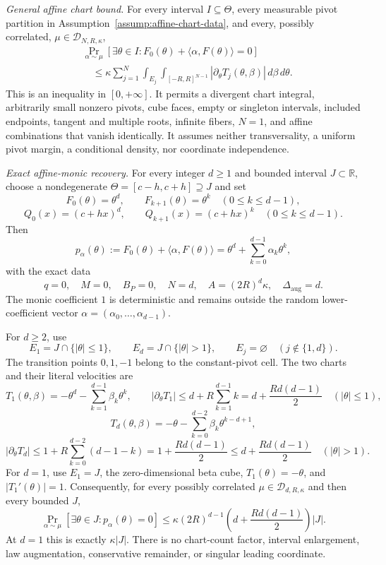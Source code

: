 \begin{theorem}
\emph{General affine chart bound.}
For every interval $I\subseteq\Theta$, every measurable pivot partition in
Assumption~\ref{assump:affine-chart-data}, and every, possibly correlated,
$\mu\in\mathcal D_{N,R,\kappa}$,
\[
\begin{aligned}
&\Pr_{\alpha\sim\mu}
 [\exists\theta\in I:F_0(\theta)+\langle\alpha,F(\theta)\rangle=0]\\
&\quad\leq
\kappa\sum_{j=1}^N\int_{E_j}\int_{[-R,R]^{N-1}}
 |\partial_\theta T_j(\theta,\beta)|\,d\beta\,d\theta.
\end{aligned}
\tag{R3}
\]
This is an inequality in $[0,+\infty]$.  It permits a divergent chart
integral, arbitrarily small nonzero pivots, cube faces, empty or singleton
intervals, included endpoints, tangent and multiple roots, infinite fibers,
$N=1$, and affine combinations that vanish identically.  It assumes neither
transversality, a uniform pivot margin, a conditional density, nor coordinate
independence.

\emph{Exact affine-monic recovery.}
For every integer $d\geq1$ and bounded interval $J\subset\mathbb R$, choose a
nondegenerate $\Theta=[c-h,c+h]\supseteq J$ and set
\[
F_0(\theta)=\theta^d,
\qquad
F_{k+1}(\theta)=\theta^k\quad(0\leq k\leq d-1),
\]
\[
Q_0(x)=(c+hx)^d,
\qquad
Q_{k+1}(x)=(c+hx)^k\quad(0\leq k\leq d-1).
\]
Then
\[
p_\alpha(\theta)
:=F_0(\theta)+\langle\alpha,F(\theta)\rangle
=\theta^d+\sum_{k=0}^{d-1}\alpha_k\theta^k,
\]
with the exact data
\[
q=0,
\quad M=0,
\quad B_P=0,
\quad N=d,
\quad A=(2R)^d\kappa,
\quad \Delta_{\mathrm{aug}}=d.
\]
The monic coefficient $1$ is deterministic and remains outside the random
lower-coefficient vector $\alpha=(\alpha_0,\ldots,\alpha_{d-1})$.

For $d\geq2$, use
\[
E_1=J\cap\{|\theta|\leq1\},
\qquad
E_d=J\cap\{|\theta|>1\},
\qquad
E_j=\varnothing\quad(j\notin\{1,d\}).
\]
The transition points $0,1,-1$ belong to the constant-pivot cell.  The two
charts and their literal velocities are
\[
T_1(\theta,\beta)
=-\theta^d-\sum_{k=1}^{d-1}\beta_k\theta^k,
\qquad
|\partial_\theta T_1|
\leq d+R\sum_{k=1}^{d-1}k
=d+\frac{Rd(d-1)}2
\quad(|\theta|\leq1),
\]
\[
T_d(\theta,\beta)
=-\theta-\sum_{k=0}^{d-2}\beta_k\theta^{k-d+1},
\]
\[
|\partial_\theta T_d|
\leq1+R\sum_{k=0}^{d-2}(d-1-k)
=1+\frac{Rd(d-1)}2
\leq d+\frac{Rd(d-1)}2
\quad(|\theta|>1).
\]
For $d=1$, use $E_1=J$, the zero-dimensional beta cube,
$T_1(\theta)=-\theta$, and $|T_1'(\theta)|=1$.  Consequently, for every
possibly correlated $\mu\in\mathcal D_{d,R,\kappa}$ and then every bounded
$J$,
\[
\Pr_{\alpha\sim\mu}[\exists\theta\in J:p_\alpha(\theta)=0]
\leq\kappa(2R)^{d-1}
 \left(d+\frac{Rd(d-1)}2\right)|J|.
\tag{R4}
\]
At $d=1$ this is exactly $\kappa|J|$.  There is no chart-count factor,
interval enlargement, law augmentation, conservative remainder, or singular
leading coordinate.


\end{theorem}
